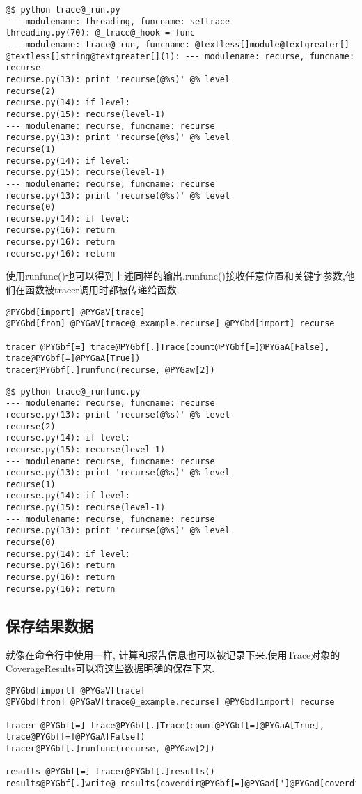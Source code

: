 \documentclass[letterpaper,10pt,english]{manual}
\begin{document}
\begin{Verbatim}[commandchars=@\[\]]
@$ python trace@_run.py
--- modulename: threading, funcname: settrace
threading.py(70): @_trace@_hook = func
--- modulename: trace@_run, funcname: @textless[]module@textgreater[]
@textless[]string@textgreater[](1): --- modulename: recurse, funcname: recurse
recurse.py(13): print 'recurse(@%s)' @% level
recurse(2)
recurse.py(14): if level:
recurse.py(15): recurse(level-1)
--- modulename: recurse, funcname: recurse
recurse.py(13): print 'recurse(@%s)' @% level
recurse(1)
recurse.py(14): if level:
recurse.py(15): recurse(level-1)
--- modulename: recurse, funcname: recurse
recurse.py(13): print 'recurse(@%s)' @% level
recurse(0)
recurse.py(14): if level:
recurse.py(16): return
recurse.py(16): return
recurse.py(16): return
\end{Verbatim}

使用runfunc()也可以得到上述同样的输出.runfunc()接收任意位置和关键字参数,他们在函数被tracer调用时都被传递给函数.

\begin{Verbatim}[commandchars=@\[\]]
@PYGbd[import] @PYGaV[trace]
@PYGbd[from] @PYGaV[trace@_example.recurse] @PYGbd[import] recurse

tracer @PYGbf[=] trace@PYGbf[.]Trace(count@PYGbf[=]@PYGaA[False], trace@PYGbf[=]@PYGaA[True])
tracer@PYGbf[.]runfunc(recurse, @PYGaw[2])
\end{Verbatim}

\begin{Verbatim}[commandchars=@\[\]]
@$ python trace@_runfunc.py
--- modulename: recurse, funcname: recurse
recurse.py(13): print 'recurse(@%s)' @% level
recurse(2)
recurse.py(14): if level:
recurse.py(15): recurse(level-1)
--- modulename: recurse, funcname: recurse
recurse.py(13): print 'recurse(@%s)' @% level
recurse(1)
recurse.py(14): if level:
recurse.py(15): recurse(level-1)
--- modulename: recurse, funcname: recurse
recurse.py(13): print 'recurse(@%s)' @% level
recurse(0)
recurse.py(14): if level:
recurse.py(16): return
recurse.py(16): return
recurse.py(16): return
\end{Verbatim}


\subsection{保存结果数据}

就像在命令行中使用一样, 计算和报告信息也可以被记录下来.使用Trace对象的CoverageResults可以将这些数据明确的保存下来.

\begin{Verbatim}[commandchars=@\[\]]
@PYGbd[import] @PYGaV[trace]
@PYGbd[from] @PYGaV[trace@_example.recurse] @PYGbd[import] recurse

tracer @PYGbf[=] trace@PYGbf[.]Trace(count@PYGbf[=]@PYGaA[True], trace@PYGbf[=]@PYGaA[False])
tracer@PYGbf[.]runfunc(recurse, @PYGaw[2])

results @PYGbf[=] tracer@PYGbf[.]results()
results@PYGbf[.]write@_results(coverdir@PYGbf[=]@PYGad[']@PYGad[coverdir2]@PYGad['])
\end{Verbatim}
\end{document}
